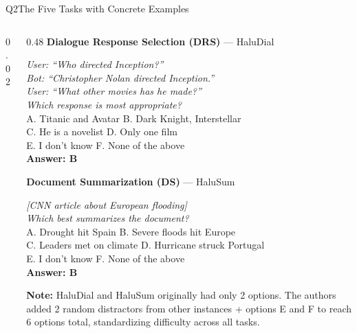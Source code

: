 \documentclass[aspectratio=169,10pt]{beamer}
\begin{document}
\begin{frame}{Q2\enspace The Five Tasks with Concrete Examples}
\begin{columns}[T]
  \begin{column}{0.02\textwidth}\color{Rule}\vrule\end{column}

  \begin{column}{0.48\textwidth}
    {\small\bfseries\color{darkred}Dialogue Response Selection (DRS)} — HaluDial
    \vspace{0.2em}
    \begin{tcolorbox}[colback=CodeBg,colframe=Rule,boxrule=0.4pt,arc=2pt,left=2pt,right=2pt,top=2pt,bottom=2pt,fontupper=\tiny]
      \textit{User: ``Who directed Inception?''}\\
      \textit{Bot: ``Christopher Nolan directed Inception.''}\\
      \textit{User: ``What other movies has he made?''}\\
      \textit{Which response is most appropriate?}\\
      A. Titanic and Avatar \quad B. Dark Knight, Interstellar\\
      C. He is a novelist \quad D. Only one film\\
      E. I don't know \quad F. None of the above\\
      {\color{GreenOk}\bfseries Answer: B}
    \end{tcolorbox}
    
    {\small\bfseries\color{darkred}Document Summarization (DS)} — HaluSum
    \vspace{0.2em}
    \begin{tcolorbox}[colback=CodeBg,colframe=Rule,boxrule=0.4pt,arc=2pt,left=2pt,right=2pt,top=2pt,bottom=2pt,fontupper=\tiny]
      \textit{[CNN article about European flooding]}\\
      \textit{Which best summarizes the document?}\\
      A. Drought hit Spain \quad B. Severe floods hit Europe\\
      C. Leaders met on climate \quad D. Hurricane struck Portugal\\
      E. I don't know \quad F. None of the above\\
      {\color{GreenOk}\bfseries Answer: B}
    \end{tcolorbox}
    
    \vspace{0.3em}
    {\footnotesize\color{Slate}
      \textbf{Note:} HaluDial and HaluSum originally had only 2 options. The authors added 2 random distractors from other instances + options E and F to reach 6 options total, standardizing difficulty across all tasks.}
  \end{column}
\end{columns}
\end{frame}
\end{document}
